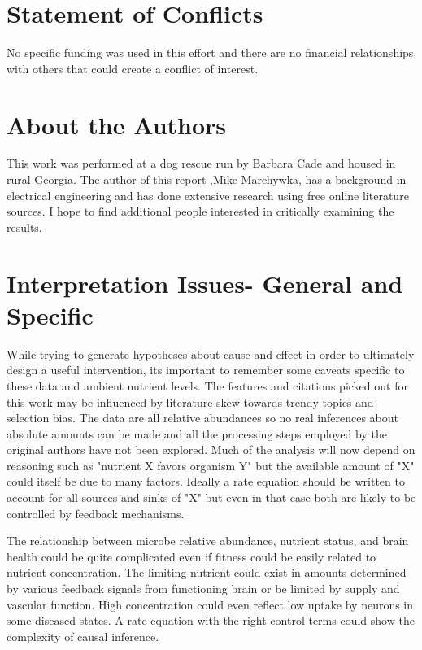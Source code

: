 \documentclass[aps,secnumarabic,balancelastpage,amsmath,amssymb,nofootinbib]{revtex4}
\begin{document}
\clearpage
\appendix


\section{ Statement of Conflicts }
 No specific funding was used in this effort and there are no financial
relationships with others that could create a conflict of interest. 

\section{About the Authors}
This work was performed at a dog rescue run by Barbara Cade and
housed in rural Georgia.  The author of this report 
,Mike Marchywka,
has a background in electrical engineering and 
has done extensive research using free online literature sources.  
I hope to find additional people interested in critically 
examining the results.

\section{Interpretation Issues- General and Specific }
\label{appendix:interp}

While trying to generate hypotheses about cause and effect
in order to ultimately design a useful intervention, its
important to remember some caveats specific to these data
and ambient nutrient levels. 
The features and citations picked out for this work may be
influenced by literature skew towards trendy topics and
selection bias. 
The data are all relative
abundances so no real inferences about absolute
amounts can be made and all the processing
steps employed by the original authors have not been
explored. Much of the analysis will now depend
on reasoning such as "nutrient X favors organism Y"
but the available amount of "X" could itself be
due to many factors. Ideally a rate equation
should be written to account for all sources and sinks
of "X" but even in that case both are likely to be
controlled by feedback mechanisms. 

\begin{comment}
Tryptophan along
similar to restricted  biotin import,  have been shown to be exported in
times expected to beneeded by the brain but
transport into the CNS may be impeded. 
\end{comment}

The relationship between microbe relative abundance,
nutrient status, and brain health could be quite complicated
even if fitness could be easily related to nutrient
concentration. The limiting nutrient could exist
in amounts determined by various feedback signals
from functioning brain or be limited by supply and
vascular function. High concentration could even reflect
low uptake by neurons in some diseased states. A rate
equation with the right control terms could show the complexity
of causal inference. 
\end{document}

